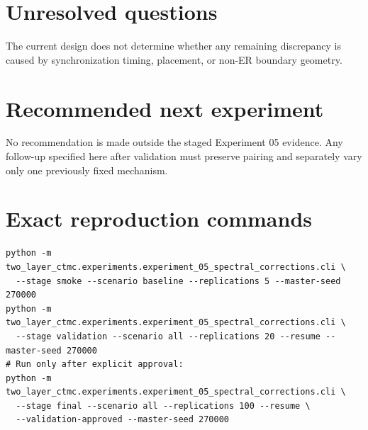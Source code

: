 \documentclass[11pt]{article}
\begin{document}
\section{Unresolved questions}
The current design does not determine whether any remaining discrepancy is caused
by synchronization timing, placement, or non-ER boundary geometry.

\section{Recommended next experiment}
No recommendation is made outside the staged Experiment 05 evidence. Any follow-up
specified here after validation must preserve pairing and separately vary only one
previously fixed mechanism.

\section{Exact reproduction commands}
\begin{verbatim}
python -m two_layer_ctmc.experiments.experiment_05_spectral_corrections.cli \
  --stage smoke --scenario baseline --replications 5 --master-seed 270000
python -m two_layer_ctmc.experiments.experiment_05_spectral_corrections.cli \
  --stage validation --scenario all --replications 20 --resume --master-seed 270000
# Run only after explicit approval:
python -m two_layer_ctmc.experiments.experiment_05_spectral_corrections.cli \
  --stage final --scenario all --replications 100 --resume \
  --validation-approved --master-seed 270000
\end{verbatim}
\end{document}
